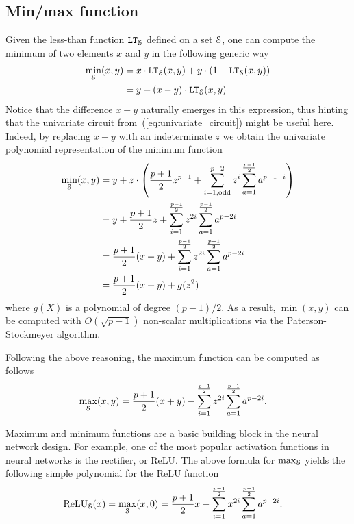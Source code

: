 \subsection{Min/max function}

  Given the less-than function $\LT_\S$ defined on a set $\S$, one can compute the minimum of two elements $x$ and $y$ in the following generic way
  \begin{align*}
    \min_\S(x,y) &= x \cdot \LT_\S(x,y) + y \cdot (1 - \LT_\S(x,y)) \\
    &= y + (x-y) \cdot \LT_\S(x,y)
  \end{align*}
  Notice that the difference $x - y$ naturally emerges in this expression, thus hinting that the univariate circuit from~(\ref{eq:univariate_circuit}) might be useful here.
  Indeed, by replacing $x - y$ with an indeterminate $z$ we obtain the univariate polynomial representation of the minimum function 
  \begin{align*}
    \min_\S(x,y) & = y + z \cdot \left(\frac{p+1}{2} z^{p-1} + \sum_{i=1, \text{odd}}^{p-2} z^i \sum_{a=1}^{\frac{p-1}{2}} a^{p-1-i}\right) \\
    & = y + \frac{p+1}{2} z + \sum_{i=1}^{\frac{p-1}{2}} z^{2i} \sum_{a=1}^{\frac{p-1}{2}} a^{p-2i} \\
    & = \frac{p+1}{2} (x+y) + \sum_{i=1}^{\frac{p-1}{2}} z^{2i} \sum_{a=1}^{\frac{p-1}{2}} a^{p-2i} \\
    & = \frac{p+1}{2} (x+y) + g(z^2)
  \end{align*}
  where $g(X)$ is a polynomial of degree $(p-1)/2$. 
  As a result, $\min(x,y)$ can be computed with $O(\sqrt{p-1})$ non-scalar multiplications via the Paterson-Stockmeyer algorithm.

  Following the above reasoning, the maximum function can be computed as follows
  \begin{align*}
    \max_\S(x,y) &= \frac{p+1}{2} (x+y) - \sum_{i=1}^{\frac{p-1}{2}} z^{2i} \sum_{a=1}^{\frac{p-1}{2}} a^{p-2i}.
  \end{align*}
  \begin{remark}
    Maximum and minimum functions are a basic building block in the neural network design.
    For example, one of the most popular activation functions in neural networks is the rectifier, or ReLU.
    The above formula for $\max_\S$ yields the following simple polynomial for the ReLU function
    \begin{align*}
      \ReLU_\S(x) = \max_\S(x,0) &= \frac{p+1}{2} x - \sum_{i=1}^{\frac{p-1}{2}} x^{2i} \sum_{a=1}^{\frac{p-1}{2}} a^{p-2i}.
    \end{align*}
  \end{remark}

